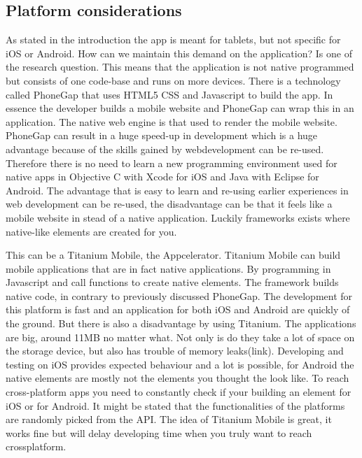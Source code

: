 \documentclass[10pt,a4paper]{article}
\begin{document}
\subsection{Platform considerations}
As stated in the introduction the app is meant for tablets, but not specific for iOS or Android. How can we maintain this demand on the application? Is one of the research question. This means that the application is not native programmed but consists of one code-base and runs on more devices. There is a technology called PhoneGap that uses HTML5 CSS and Javascript to build the app. In essence the developer builds a mobile website and PhoneGap can wrap this in an application. The native web engine is that used to render the mobile website. PhoneGap can result in a huge speed-up in development which is a huge advantage because of the skills gained by webdevelopment can be re-used. Therefore there is no need to learn a new programming environment used for native apps in Objective C with Xcode for iOS and Java with Eclipse for Android. The advantage that is easy to learn and re-using earlier experiences in web development can be re-used, the disadvantage can be that it feels like a mobile website in stead of a native application. Luckily frameworks exists where native-like elements are created for you. 

This can be a Titanium Mobile, the Appcelerator. Titanium Mobile can build mobile applications that are in fact native applications. By programming in Javascript and call functions to create native elements. The framework builds native code, in contrary to previously discussed PhoneGap. The development for this platform is fast and an application for both iOS and Android are quickly of the ground. But there is also a disadvantage by using Titanium. The applications are big, around 11MB no matter what. Not only is do they take a lot of space on the storage device, but also has trouble of memory leaks(link).  Developing and testing on iOS provides expected behaviour and a lot is possible, for Android the native elements are mostly not the elements you thought the look like. To reach cross-platform apps you need to constantly check if your building an element for iOS or for Android. It might be stated that the functionalities of the platforms are randomly picked from the API. The idea of Titanium Mobile is great, it works fine but will delay developing time when you truly want to reach crossplatform. 
\end{document}
